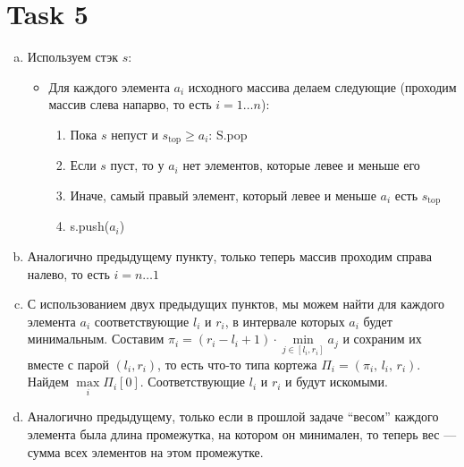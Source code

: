\newpage
\section{Task 5}
\begin{enumerate}[(a)]
    \item Используем стэк $s$:
    \begin{itemize}
        \item Для каждого элемента $a_i$ исходного массива делаем следующие (проходим массив слева напарво, то есть $i = 1 \ldots n$):
        \begin{enumerate}[1)]
            \item Пока $s$ непуст и $s_{\text{top}} \geq a_i$: S.pop
            \item Если $s$ пуст, то у $a_i$ нет элементов, которые левее и меньше его
            \item Иначе, самый правый элемент, который левее и меньше $a_i$ есть $s_{\text{top}}$
            \item s.push($a_i$)
        \end{enumerate}
    \end{itemize}
    \item Аналогично предыдущему пункту, только теперь массив проходим справа налево, то есть $i = n \ldots 1$
    \item С использованием двух предыдущих пунктов, мы можем найти для каждого элемента $a_i$ соответствующие $l_i$ и $r_i$, в интервале которых $a_i$ будет минимальным. Составим $\pi_i = (r_i - l_i + 1)\cdot\min\limits_{j\in[l_i,r_i]}a_j$ и сохраним их вместе с парой $(l_i, r_i)$, то есть что-то типа кортежа $\Pi_i = (\pi_i,\, l_i,\, r_i)$. Найдем $\max\limits_{i}\Pi_i[0]$. Соответствующие $l_i$ и $r_i$ и будут искомыми.
    \item Аналогично предыдущему, только если в прошлой задаче ``весом'' каждого элемента была длина промежутка, на котором он минимален, то теперь вес --- сумма всех элементов на этом промежутке.
\end{enumerate}

